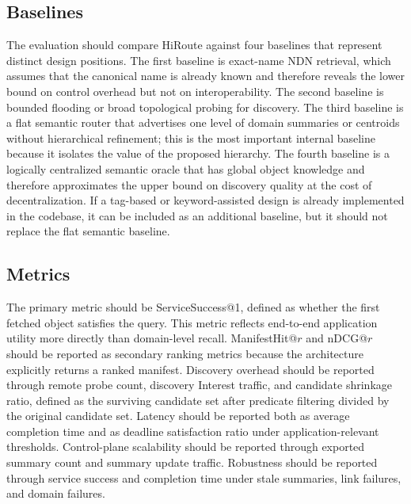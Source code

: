 \documentclass[journal]{IEEEtran}
\newcommand{\sysname}{HiRoute}
\begin{document}
\subsection{Baselines}

The evaluation should compare \sysname{} against four baselines that represent distinct design positions. The first baseline is exact-name NDN retrieval, which assumes that the canonical name is already known and therefore reveals the lower bound on control overhead but not on interoperability. The second baseline is bounded flooding or broad topological probing for discovery. The third baseline is a flat semantic router that advertises one level of domain summaries or centroids without hierarchical refinement; this is the most important internal baseline because it isolates the value of the proposed hierarchy. The fourth baseline is a logically centralized semantic oracle that has global object knowledge and therefore approximates the upper bound on discovery quality at the cost of decentralization. If a tag-based or keyword-assisted design is already implemented in the codebase, it can be included as an additional baseline, but it should not replace the flat semantic baseline.

\subsection{Metrics}

The primary metric should be ServiceSuccess@1, defined as whether the first fetched object satisfies the query. This metric reflects end-to-end application utility more directly than domain-level recall. ManifestHit@$r$ and nDCG@$r$ should be reported as secondary ranking metrics because the architecture explicitly returns a ranked manifest. Discovery overhead should be reported through remote probe count, discovery Interest traffic, and candidate shrinkage ratio, defined as the surviving candidate set after predicate filtering divided by the original candidate set. Latency should be reported both as average completion time and as deadline satisfaction ratio under application-relevant thresholds. Control-plane scalability should be reported through exported summary count and summary update traffic. Robustness should be reported through service success and completion time under stale summaries, link failures, and domain failures.
\end{document}
